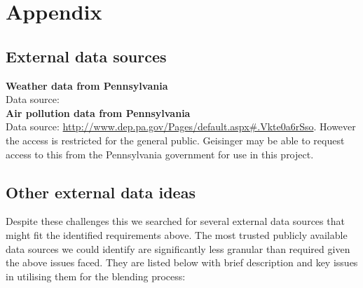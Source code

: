 \documentclass{article}
\begin{document}
\section{Appendix}

\subsection{External data sources}


{\bf Weather data from Pennsylvania}\\
Data source: \\

{\bf Air pollution data from Pennsylvania}\\
Data source: \url{http://www.dep.pa.gov/Pages/default.aspx#.Vkte0a6rSso}. However the access is restricted for the general public. Geisinger may be able to request access to this from the Pennsylvania government for use in this project.

\subsection{Other external data ideas}

Despite these challenges this we searched for several external data sources that might fit the identified requirements above. The most trusted publicly available data sources we could identify are 
significantly less granular than required given the above issues faced. They are 
listed below with brief description and key issues in utilising them 
for the blending process:
\end{document}
